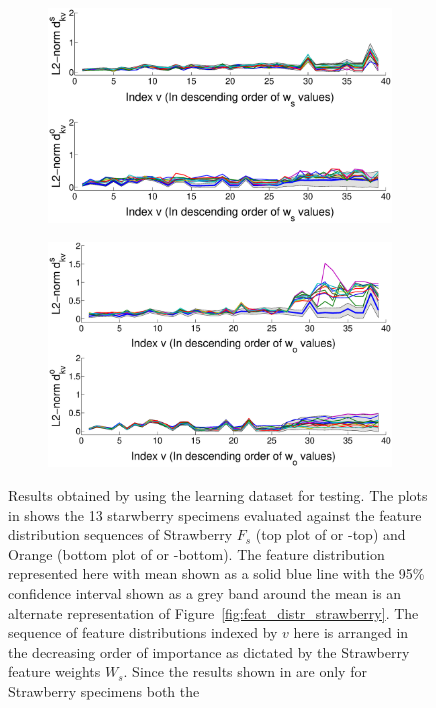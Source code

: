 \documentclass {udthesis}
\begin{document}
%
\begin{figure}
  \centering
  \vskip -10pt
  \begin{subfigure}[]{0.6\textwidth}
      \hskip -0.5cm
      \includegraphics[width=\textwidth, trim={0.5cm 0 3.8cm 0}, clip]{strawberry_learning_results}
      \caption{}
      \label{fig:feat_results_strawberry}
  \end{subfigure}
  \vskip -2pt
  \begin{subfigure}[]{0.6\textwidth}
      \hskip -0.5cm
      \includegraphics[width=\textwidth, trim={0.5cm 0 3.8cm 0}, clip]{orange_learning_results}
      \caption{}
      \label{fig:feat_results_orange}
  \end{subfigure}
\caption[Validation results showing the conformance of the specimens to the learnt feature distributions]{Results obtained by using the learning dataset for testing. The plots in  shows the 13 starwberry specimens evaluated against the feature distribution sequences of Strawberry $F_s$ (top plot of  or -top) and Orange (bottom plot of  or -bottom). The feature distribution represented here with mean shown as a solid blue line with the 95\% confidence interval shown as a grey band around the mean is an alternate representation of Figure~\ref{fig:feat_distr_strawberry}. The sequence of feature distributions indexed by $v$ here is arranged in the decreasing order of importance as dictated by the Strawberry feature weights $W_s$. Since the results shown in  are only for Strawberry specimens both the 
}
\end{figure}
\end{document}
